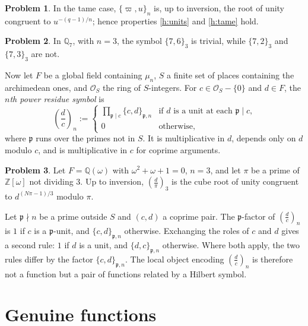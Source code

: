 \documentclass[reqno]{amsart}
\providecommand{\qr}[2]{\left(\frac{#1}{#2}\right)}
\newcommand{\pp}{\mathfrak{p}}
\numberwithin{equation}{section}
\theoremstyle{definition}
\newtheorem{problem}{Problem}[section]
\theoremstyle{plain}
\begin{document}
\begin{problem}\label{pr:hilb-tame}
  In the tame case, $\{\varpi, u\}_n$ is, up to inversion, the root of unity congruent to $u^{-(q-1)/n}$; hence properties \ref{h:units} and \ref{h:tame} hold.
\end{problem}

\begin{problem}\label{pr:hilb-q7}
  In $\mathbb{Q}_7$, with $n = 3$, the symbol $\{7, 6\}_3$ is trivial, while $\{7, 2\}_3$ and $\{7, 3\}_3$ are not.
\end{problem}

Now let $F$ be a global field containing $\mu_n$, $S$ a finite set of places containing the archimedean ones, and $\mathcal{O}_S$ the ring of $S$-integers.  For $c \in \mathcal{O}_S - \{0\}$ and $d \in F$, the \emph{$n$th power residue symbol} is
\begin{equation*}
  \qr{d}{c}_n :=
  \begin{cases}
    \prod_{\pp \mid c} \{c, d\}_{\pp, n} & \text{if $d$ is a unit at each $\pp \mid c$,} \\
    0 & \text{otherwise,}
  \end{cases}
\end{equation*}
where $\pp$ runs over the primes not in $S$.  It is multiplicative in $d$, depends only on $d$ modulo $c$, and is multiplicative in $c$ for coprime arguments.

\begin{problem}\label{pr:hilb-residue}
  Let $F = \mathbb{Q}(\omega)$ with $\omega^2 + \omega + 1 = 0$, $n = 3$, and let $\pi$ be a prime of $\mathbb{Z}[\omega]$ not dividing $3$.  Up to inversion, $\qr{d}{\pi}_3$ is the cube root of unity congruent to $d^{(N \pi - 1)/3}$ modulo $\pi$.
\end{problem}

Let $\pp \nmid n$ be a prime outside $S$ and $(c, d)$ a coprime pair.  The $\pp$-factor of $\qr{d}{c}_n$ is $1$ if $c$ is a $\pp$-unit, and $\{c, d\}_{\pp, n}$ otherwise.  Exchanging the roles of $c$ and $d$ gives a second rule: $1$ if $d$ is a unit, and $\{d, c\}_{\pp, n}$ otherwise.  Where both apply, the two rules differ by the factor $\{c, d\}_{\pp, n}$.  The local object encoding $\qr{d}{c}_n$ is therefore not a function but a pair of functions related by a Hilbert symbol.

\section{Genuine functions}\label{sec:genuine}
\end{document}
